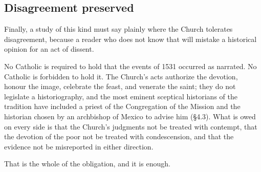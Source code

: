\subsection{Disagreement preserved}

Finally, a study of this kind must say plainly where the Church
tolerates disagreement, because a reader who does not know that will
mistake a historical opinion for an act of dissent.

No Catholic is required to hold that the events of 1531 occurred as
narrated. No Catholic is forbidden to hold it. The Church's acts
authorize the devotion, honour the image, celebrate the feast, and
venerate the saint; they do not legislate a historiography, and the
most eminent sceptical historians of the tradition have included a
priest of the Congregation of the Mission and the historian chosen by
an archbishop of Mexico to advise him (\S4.3). What is owed on every
side is that the Church's judgments not be treated with contempt,
that the devotion of the poor not be treated with condescension, and
that the evidence not be misreported in either direction.

That is the whole of the obligation, and it is enough.
